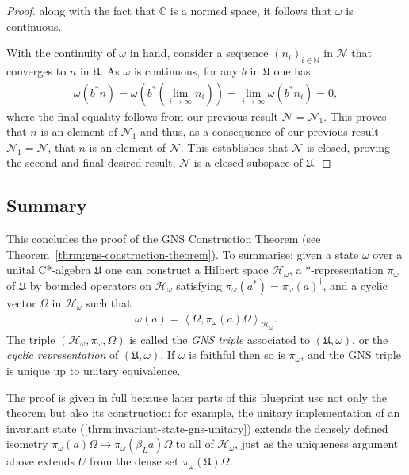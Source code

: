 \begin{proof}
\noindent along with the fact that $\mathbb{C}$ is a normed space, it follows that $\omega$ is continuous.

With the continuity of $\omega$ in hand, consider a sequence $(n_i)_{i \in \mathbb{N}}$ in $\mathcal{N}$ that converges to $n$ in $\mathfrak{U}$. As $\omega$ is continuous, for any $b$ in $\mathfrak{U}$ one has
\begin{align}
    \omega\left(b^*n\right) = \omega\left(b^*(\lim\limits_{i \rightarrow \infty} n_i)\right) = \lim\limits_{i \rightarrow \infty} \omega(b^*n_i) = 0,
\end{align}
where the final equality follows from our previous result $\mathcal{N} = \mathcal{N}_1$. This proves that $n$ is an element of $\mathcal{N}_1$ and thus, as a consequence of our previous result $\mathcal{N}_1 = \mathcal{N}$, that $n$ is an element of $\mathcal{N}$. This establishes that $\mathcal{N}$ is closed, proving the second and final desired result, $\mathcal{N}$ is a closed subspace of $\mathfrak{U}$.
\end{proof}

\subsection{Summary}
This concludes the proof of the GNS Construction Theorem (see Theorem~\ref{thrm:gns-construction-theorem}). To summarise: given a state $\omega$ over a unital C*-algebra $\mathfrak{U}$ one can construct a Hilbert space $\mathcal{H}_\omega$, a *-representation $\pi_\omega$ of $\mathfrak{U}$ by bounded operators on $\mathcal{H}_\omega$ satisfying $\pi_\omega(a^*) = \pi_\omega(a)^\dagger$, and a cyclic vector $\Omega$ in $\mathcal{H}_\omega$ such that
\begin{align}
    \omega(a) = \left<\Omega, \pi_\omega(a)\Omega\right>_{\mathcal{H}_\omega}.
\end{align}
The triple $(\mathcal{H}_\omega, \pi_\omega, \Omega)$ is called the \textit{GNS triple} associated to $(\mathfrak{U}, \omega)$, or the \textit{cyclic representation} of $(\mathfrak{U}, \omega)$. If $\omega$ is faithful then so is $\pi_\omega$, and the GNS triple is unique up to unitary equivalence.

\noindent The proof is given in full because later parts of this blueprint use not only the theorem but also its construction: for example, the unitary implementation of an invariant state (\ref{thrm:invariant-state-gns-unitary}) extends the densely defined isometry $\pi_\omega(a)\Omega \mapsto \pi_\omega(\beta_L a)\Omega$ to all of $\mathcal{H}_\omega$, just as the uniqueness argument above extends $U$ from the dense set $\pi_\omega(\mathfrak{U})\Omega$.
